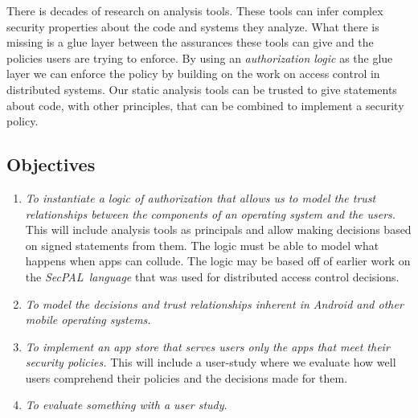 \documentclass[report.tex]{subfiles}
\begin{document}
There is decades of research on analysis tools.  These tools can infer complex
security properties about the code and systems they analyze.  What there is
missing is a glue layer between the assurances these tools can give and the
policies users are trying to enforce.  By using an \emph{authorization logic} as
the glue layer we can enforce the policy by building on the work on access
control in distributed systems.  Our static analysis tools can be trusted to
give statements about code, with other principles, that can be combined to
implement a security policy.


\subsection{Objectives}

\begin{enumerate}
  \item \emph{To instantiate a logic of authorization that allows us to model
      the trust relationships between the components of an operating system and
      the users.}  This will include analysis tools as principals and allow
    making decisions based on signed statements from them.  The logic must be
    able to model what happens when apps can collude.  The logic may be based
    off of earlier work on the \emph{SecPAL~language}\cite{Becker:2006vh} that
    was used for distributed access control decisions.

  \item \emph{To model the decisions and trust relationships inherent in Android
      and other mobile operating systems.} 

  \item \emph{To implement an app store that serves users only the apps that
      meet their security policies.}  This will include a user-study where we
    evaluate how well users comprehend their policies and the decisions made for
    them.

  \item \emph{To evaluate something with a user study}.

\end{enumerate}
\end{document}
